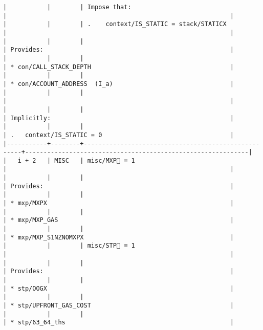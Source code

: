 \documentclass[varwidth=\maxdimen,margin=0.5cm,multi={verbatim}]{standalone}
\begin{document}
\begin{verbatim}
|           |        | Impose that:                                        |                                                             |
|           |        | .    context/IS_STATIC = stack/STATICX              |                                                             |
|           |        |                                                     | Provides:                                                   |
|           |        |                                                     | * con/CALL_STACK_DEPTH                                      |
|           |        |                                                     | * con/ACCOUNT_ADDRESS  (I_a)                                |
|           |        |                                                     |                                                             |
|           |        |                                                     | Implicitly:                                                 |
|           |        |                                                     | .   context/IS_STATIC = 0                                   |
|-----------+--------+-----------------------------------------------------+-------------------------------------------------------------|
|   i + 2   | MISC   | misc/MXP🚩 ≡ 1                                      |                                                             |
|           |        |                                                     | Provides:                                                   |
|           |        |                                                     | * mxp/MXPX                                                  |
|           |        |                                                     | * mxp/MXP_GAS                                               |
|           |        |                                                     | * mxp/MXP_S1NZNOMXPX                                        |
|           |        | misc/STP🚩 ≡ 1                                      |                                                             |
|           |        |                                                     | Provides:                                                   |
|           |        |                                                     | * stp/OOGX                                                  |
|           |        |                                                     | * stp/UPFRONT_GAS_COST                                      |
|           |        |                                                     | * stp/63_64_ths                                             |

\end{verbatim}
\end{document}
